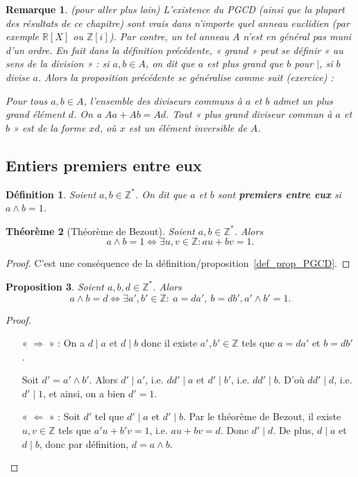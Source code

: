\documentclass[12pt]{report}
\newtheorem{thm}{Théorème}[chapter]
\newtheorem*{rem}{Remarque}
\newtheorem{Def}[thm]{Définition}
\newtheorem{Prop}[thm]{Proposition}
\newcommand{\R}{\mathbb{R}}
\newcommand{\Z}{\mathbb{Z}}
\begin{document}
\begin{rem}(pour aller plus loin) L'existence du PGCD (ainsi que la plupart des résultats de ce chapitre) sont vrais dans n'importe quel anneau euclidien (par exemple $\R[X]$ ou $\Z[i]$). Par contre, un tel anneau $A$ n'est en général pas muni d'un ordre. En fait dans la définition précédente, « grand » peut se définir « au sens de la division » : si $a,b\in A$, on dit que $a$ est plus grand que $b$ pour $|$, si $b$ divise $a$. Alors la proposition précédente se généralise comme suit (exercice) : 

Pour tous $a,b\in A$, l'ensemble des diviseurs communs à $a$ et $b$ admet un plus grand élément $d$. On a $Aa+Ab=A d$. Tout « plus grand diviseur commun à $a$ et $b $ » est de la forme $x d$, où $x$ est un élément inversible de $A$.

\end{rem}


\subsection{Entiers premiers entre eux}

\begin{Def}
Soient $a,b \in \mathbb{Z}^*$. On dit que $a$ et $b$ sont \textbf{premiers entre eux} si $a\wedge b=1$.
\end{Def}

\begin{thm}[Théorème de Bezout] Soient $a,b \in \mathbb{Z}^*$. Alors
$$  a\wedge b =1 \Longleftrightarrow \exists u,v \in \mathbb{Z}: au+bv=1.    $$
\end{thm}

\begin{proof}
C'est une conséquence de la définition/proposition~\ref{def_prop_PGCD}.
\end{proof}



\begin{Prop}\label{propReduction_cas_premiers_entre_eux}
Soient $a,b,d \in \mathbb{Z}^*$. Alors 
$$  a\wedge b=d \Longleftrightarrow \exists a',b' \in \mathbb{Z}: \ a=da', \ b=db', a'\wedge b'=1 . $$
\end{Prop}

\begin{proof}
\begin{itemize}
\item[« $ \Rightarrow$ » : ] On a $d \mid a$ et $d \mid b$ donc il existe $ a',b' \in \mathbb{Z}
 $ tels que $a=da'$ et $b=db'$. \par 
 Soit $d'=a' \wedge b'$. Alors $d' \mid a'$, i.e. $dd'\mid a$ et $d'\mid b'$, i.e. $dd' \mid b$. D'où $dd'\mid d $, i.e. $d'\mid 1$, et ainsi, on a bien $d'=1$.
 \item[« $\Leftarrow$ » : ] Soit $d'$ tel que $d'\mid a$ et $d'\mid b$. Par le théorème de Bezout, il existe  $u,v \in \mathbb{Z}$ tels que $a'u+b'v=1$, i.e. $au+bv=d$. Donc $d'\mid d$. De plus, $d \mid a$ et $d \mid b$, donc par définition, $d=a\wedge b$.  
\end{itemize}
\end{proof}
\end{document}

